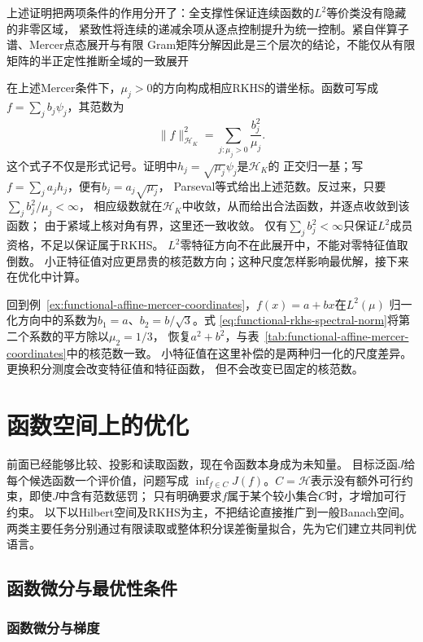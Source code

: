 上述证明把两项条件的作用分开了：全支撑性保证连续函数的$L^2$等价类没有隐藏的非零区域，
紧致性将连续的递减余项从逐点控制提升为统一控制。紧自伴算子谱、Mercer点态展开与有限
Gram矩阵分解因此是三个层次的结论，不能仅从有限矩阵的半正定性推断全域的一致展开

在上述Mercer条件下，$\mu_j>0$的方向构成相应RKHS的谱坐标。函数可写成
$f=\sum_jb_j\psi_j$，其范数为
\begin{equation}
  \lVert f\rVert_{\mathcal{H}_K}^2
  =
  \sum_{j:\mu_j>0}\frac{b_j^2}{\mu_j}.
  \label{eq:functional-rkhs-spectral-norm}
\end{equation}
这个式子不仅是形式记号。证明中$h_j=\sqrt{\mu_j}\psi_j$是$\mathcal H_K$的
正交归一基；写$f=\sum_j a_jh_j$，便有$b_j=a_j\sqrt{\mu_j}$，
Parseval等式给出上述范数。反过来，只要$\sum_j b_j^2/\mu_j<\infty$，
相应级数就在$\mathcal H_K$中收敛，从而给出合法函数，并逐点收敛到该函数；
由于紧域上核对角有界，这里还一致收敛。
仅有$\sum_j b_j^2<\infty$只保证$L^2$成员资格，不足以保证属于RKHS。
$L^2$零特征方向不在此展开中，不能对零特征值取倒数。
小正特征值对应更昂贵的核范数方向；这种尺度怎样影响最优解，接下来在优化中计算。

回到例~\ref{ex:functional-affine-mercer-coordinates}，$f(x)=a+bx$在$L^2(\mu)$
归一化方向中的系数为$b_1=a$、$b_2=b/\sqrt3$。式
\eqref{eq:functional-rkhs-spectral-norm}将第二个系数的平方除以$\mu_2=1/3$，
恢复$a^2+b^2$，与表~\ref{tab:functional-affine-mercer-coordinates}中的核范数一致。
小特征值在这里补偿的是两种归一化的尺度差异。更换积分测度会改变特征值和特征函数，
但不会改变已固定的核范数。

\section{函数空间上的优化}
\label{sec:functional-class-size-smoothness}

前面已经能够比较、投影和读取函数，现在令函数本身成为未知量。
目标泛函$J$给每个候选函数一个评价值，问题写成
$\inf_{f\in C}J(f)$。$C=\mathcal H$表示没有额外可行约束，即使$J$中含有范数惩罚；
只有明确要求$f$属于某个较小集合$C$时，才增加可行约束。
以下以Hilbert空间及RKHS为主，不把结论直接推广到一般Banach空间。
两类主要任务分别通过有限读取或整体积分误差衡量拟合，先为它们建立共同判优语言。

\subsection{函数微分与最优性条件}

\subsubsection{函数微分与梯度}

